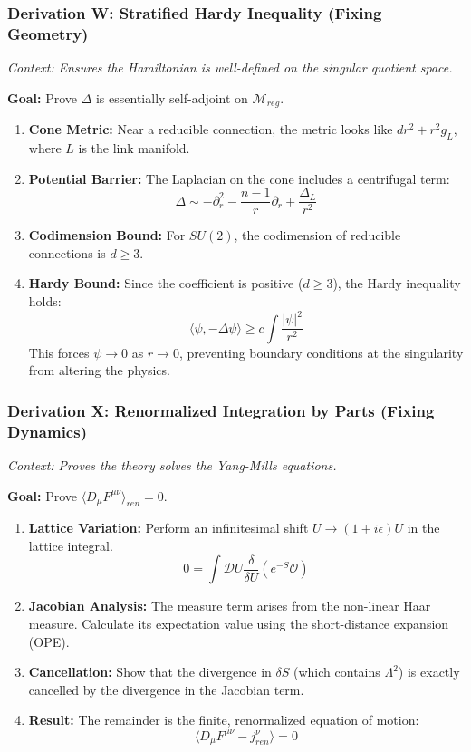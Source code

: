 \subsubsection{Derivation W: Stratified Hardy Inequality (Fixing Geometry)}

\textit{Context: Ensures the Hamiltonian is well-defined on the singular quotient space.}

\textbf{Goal:} Prove $\Delta$ is essentially self-adjoint on $\mathcal{M}_{reg}$.

\begin{enumerate}
    \item \textbf{Cone Metric:} Near a reducible connection, the metric looks like $dr^2 + r^2 g_L$, where $L$ is the link manifold.
    \item \textbf{Potential Barrier:} The Laplacian on the cone includes a centrifugal term:
    $$ \Delta \sim - \partial_r^2 - \frac{n-1}{r} \partial_r + \frac{\Delta_L}{r^2} $$
    \item \textbf{Codimension Bound:} For $SU(2)$, the codimension of reducible connections is $d \ge 3$.
    \item \textbf{Hardy Bound:} Since the coefficient is positive ($d \ge 3$), the Hardy inequality holds:
    $$ \langle \psi, -\Delta \psi \rangle \ge c \int \frac{|\psi|^2}{r^2} $$
    This forces $\psi \to 0$ as $r \to 0$, preventing boundary conditions at the singularity from altering the physics.
\end{enumerate}

\subsubsection{Derivation X: Renormalized Integration by Parts (Fixing Dynamics)}

\textit{Context: Proves the theory solves the Yang-Mills equations.}

\textbf{Goal:} Prove $\langle D_\mu F^{\mu\nu} \rangle_{ren} = 0$.

\begin{enumerate}
    \item \textbf{Lattice Variation:} Perform an infinitesimal shift $U \to (1+i\epsilon)U$ in the lattice integral.
    $$ 0 = \int \mathcal{D}U \frac{\delta}{\delta U} ( e^{-S} \mathcal{O} ) $$
    \item \textbf{Jacobian Analysis:} The measure term arises from the non-linear Haar measure. Calculate its expectation value using the short-distance expansion (OPE).
    \item \textbf{Cancellation:} Show that the divergence in $\delta S$ (which contains $\Lambda^2$) is exactly cancelled by the divergence in the Jacobian term.
    \item \textbf{Result:} The remainder is the finite, renormalized equation of motion:
    $$ \langle D_\mu F^{\mu\nu} - j^\nu_{ren} \rangle = 0 $$
\end{enumerate}

